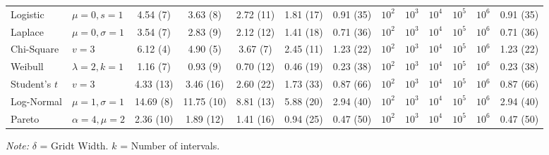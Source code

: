 \documentclass[12pt]{article} %
\begin{document}
\begin{enumerate}
\begin{table}
\begin{tabular}{l l | ccccc | ccccc c}
    Logistic      & $\mu = 0, s = 1$         & 4.54 (7) & 3.63 (8) & 2.72 (11) & 1.81 (17) & 0.91 (35) & $10^2$ & $10^3$ & $10^4$ & $10^5$ & $10^6$ & 0.91 (35) \\ 
    Laplace       & $\mu = 0, \sigma = 1$   & 3.54 (7) & 2.83 (9) & 2.12 (12) & 1.41 (18) & 0.71 (36) & $10^2$ & $10^3$ & $10^4$ & $10^5$ & $10^6$& 0.71 (36) \\ 
    Chi-Square    & $v = 3$                  & 6.12 (4) & 4.90 (5) & 3.67 (7) & 2.45 (11) & 1.23 (22) & $10^2$ & $10^3$ & $10^4$ & $10^5$ & $10^6$& 1.23 (22) \\ 
    Weibull       & $\lambda = 2, k = 1$     & 1.16 (7) & 0.93 (9) & 0.70 (12) & 0.46 (19) & 0.23 (38) & $10^2$ & $10^3$ & $10^4$ & $10^5$ & $10^6$& 0.23 (38) \\ 
    Student's $t$ & $v = 3$                  & 4.33 (13) & 3.46 (16) & 2.60 (22) & 1.73 (33) & 0.87 (66) & $10^2$ & $10^3$ & $10^4$ & $10^5$ & $10^6$& 0.87 (66) \\ 
    Log-Normal    & $\mu = 1, \sigma = 1$    & 14.69 (8) & 11.75 (10) & 8.81 (13) & 5.88 (20) & 2.94 (40) & $10^2$ & $10^3$ & $10^4$ & $10^5$ & $10^6$ & 2.94 (40) \\ 
    Pareto        & $\alpha = 4, \mu = 2$    & 2.36 (10) & 1.89 (12) & 1.41 (16) & 0.94 (25) & 0.47 (50) & $10^2$ & $10^3$ & $10^4$ & $10^5$ & $10^6$ & 0.47 (50) \\ 
    \bottomrule
\end{tabular}
\label{table2}
\parbox{1\linewidth}{
  \vspace{1ex}
  \footnotesize{
    \textit{Note:} $\delta$ = Gridt Width.  $k$ = Number of intervals. 
  }
}
\end{table}









\end{enumerate}
\end{document}
